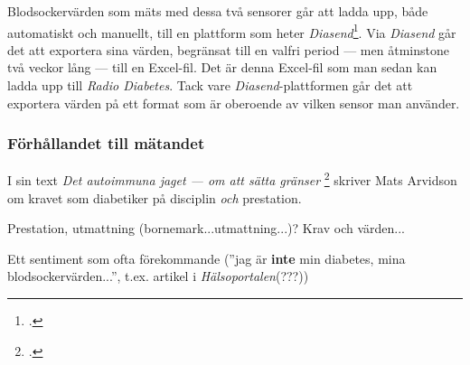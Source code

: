 \documentclass[11pt, a4paper]{article} %
\begin{document}
Blodsockervärden som mäts med dessa två sensorer går att ladda upp, både automatiskt och manuellt, till en plattform som heter \emph{Diasend}\footcite{}. Via \emph{Diasend} går det att exportera sina värden, begränsat till en valfri period --- men åtminstone två veckor lång --- till en Excel-fil. Det är denna Excel-fil som man sedan kan ladda upp till \emph{Radio Diabetes}. Tack vare \emph{Diasend}-plattformen går det att exportera värden på ett format som är oberoende av vilken sensor man använder.



\subsubsection*{Förhållandet till mätandet}
I sin text \emph{Det autoimmuna jaget --- om att sätta gränser} \footcite[286]{arvidson_det_2016} skriver Mats Arvidson om kravet som diabetiker på disciplin \emph{och} prestation.

Prestation, utmattning (bornemark...utmattning...)? Krav och värden... 

Ett sentiment som ofta förekommande (''jag är \textbf{inte} min diabetes, mina blodsockervärden...'', t.ex. artikel i \emph{Hälsoportalen}(???))
\end{document}
